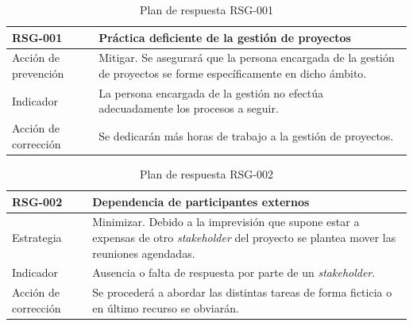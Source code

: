 \begin{table}[htpb]
\centering
\begin{tabularx}{\textwidth}{|l|X|}
\hline
\rowcolor[gray]{0.9}\textbf{RSG-001}              & \textbf{Práctica deficiente de la gestión de proyectos} \\ \hline
Acción de prevención & Mitigar. Se asegurará que la persona encargada de la gestión de proyectos se forme específicamente en dicho ámbito. \\ \hline
Indicador            & La persona encargada de la gestión no efectúa adecuadamente los procesos a seguir.                                  \\ \hline
Acción de corrección & Se dedicarán más horas de trabajo a la gestión de proyectos.                                                        \\ \hline
\end{tabularx}
\caption{Plan de respuesta RSG-001}
\end{table}


\begin{table}[htpb]
\centering
\begin{tabularx}{\textwidth}{|l|X|}
\hline
\rowcolor[gray]{0.9}\textbf{RSG-002}              & \textbf{Dependencia de participantes externos}                                                                                                                                                                  \\ \hline
Estrategia & Minimizar. Debido a la imprevisión que supone estar a expensas de otro \textit{stakeholder} del proyecto se plantea mover las reuniones agendadas. \\ \hline
Indicador            & Ausencia o falta de respuesta por parte de un \textit{stakeholder}.                                                                                                                                             \\ \hline
Acción de corrección & Se procederá a abordar las distintas tareas de forma ficticia o en último recurso se obviarán.                                                                                                        \\ \hline
\end{tabularx}
\caption{Plan de respuesta RSG-002}
\end{table}


